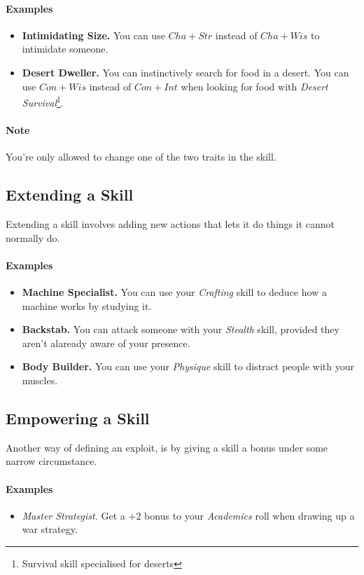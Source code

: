 \paragraph{Examples}
\begin{itemize}
    \item \textbf{Intimidating Size.} You can use $Cha+Str$ instead of $Cha+Wis$ to intimidate someone.
    \item \textbf{Desert Dweller.} You can instinctively search for food in a desert. You can use $Con+Wis$ instead of $Con+Int$ when looking for food with \textit{Desert Survival}\footnote{Survival skill specialised for deserts}.
\end{itemize}

\paragraph{Note} You're only allowed to change one of the two traits in the skill.

\subsection{Extending a Skill}
Extending a skill involves adding new actions that lets it do things it cannot normally do.

\paragraph{Examples}
\begin{itemize}
    \item \textbf{Machine Specialist.} You can use your \textit{Crafting} skill to deduce how a machine works by studying it.
    \item \textbf{Backstab.} You can attack someone with your \textit{Stealth} skill, provided they aren't alaready aware of your presence.
    \item \textbf{Body Builder.} You can use your \textit{Physique} skill to distract people with your muscles.
\end{itemize}

\subsection{Empowering a Skill}
Another way of defining an exploit, is by giving a skill a bonus under some narrow circumstance.

\paragraph{Examples}
\begin{itemize}
    \item \textit{Master Strategist.} Get a $+2$ bonus to your \textit{Academics} roll when drawing up a war strategy.
\end{itemize}

